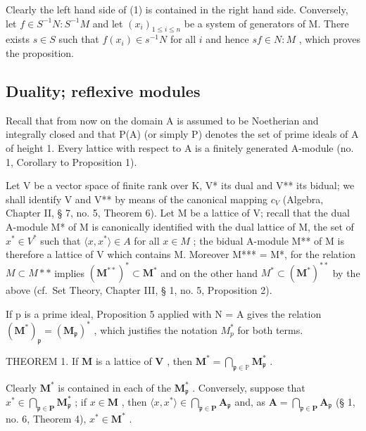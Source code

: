 Clearly the left hand side of (1) is contained in the right hand side. Conversely, let \(f \in S^{-1}N: S^{-1}M\) and let \((x_i)_{1 \leqslant i \leqslant n}\) be a system of generators of M. There exists \(s \in S\) such that \(f(x_i) \in s^{-1}N\) for all \(i\) and hence \(sf \in N: M\) , which proves the proposition.

\subsection{Duality; reflexive modules}

Recall that from now on the domain A is assumed to be Noetherian and integrally closed and that P(A) (or simply P) denotes the set of prime ideals of A of height 1. Every lattice with respect to A is a finitely generated A-module (no. 1, Corollary to Proposition 1).

Let V be a vector space of finite rank over K, V* its dual and V** its bidual; we shall identify V and V** by means of the canonical mapping \(c_{V}\) (Algebra, Chapter II, § 7, no. 5, Theorem 6). Let M be a lattice of V; recall that the dual A-module M* of M is canonically identified with the dual lattice of M, the set of \(x^{*} \in V^{*}\) such that \(\langle x, x^{*} \rangle \in A\) for all \(x \in M\) ; the bidual A-module M** of M is therefore a lattice of V which contains M. Moreover M*** = M*, for the relation \(M \subset M**\) implies \((\mathbf{M}^{**})^{*} \subset \mathbf{M}^{*}\) and on the other hand \(M^{*} \subset (\mathbf{M}^{*})^{**}\) by the above (cf.~Set Theory, Chapter III, § 1, no. 5, Proposition 2).

If p is a prime ideal, Proposition 5 applied with N = A gives the relation \((\mathbf{M}^{*})_{\mathfrak{p}} = (\mathbf{M}_{\mathfrak{p}})^{*}\) , which justifies the notation \(M_{p}^{*}\) for both terms.

THEOREM 1. If \(\mathbf{M}\) is a lattice of \(\mathbf{V}\) , then \(\mathbf{M}^{*} = \bigcap_{\mathfrak{p} \in \mathbb{P}} \mathbf{M}_{\mathfrak{p}}^{*}\) .

Clearly \(\mathbf{M}^*\) is contained in each of the \(\mathbf{M}_{\mathfrak{p}}^{*}\) . Conversely, suppose that \(x^{*} \in \bigcap_{\mathfrak{p} \in \mathbf{P}} \mathbf{M}_{\mathfrak{p}}^{*}\) ; if \(x \in \mathbf{M}\) , then \(\langle x, x^{*} \rangle \in \bigcap_{\mathfrak{p} \in \mathbf{P}} \mathbf{A}_{\mathfrak{p}}\) and, as \(\mathbf{A} = \bigcap_{\mathfrak{p} \in \mathbf{P}} \mathbf{A}_{\mathfrak{p}}\) (§ 1, no. 6, Theorem 4), \(x^{*} \in \mathbf{M}^{*}\) .

